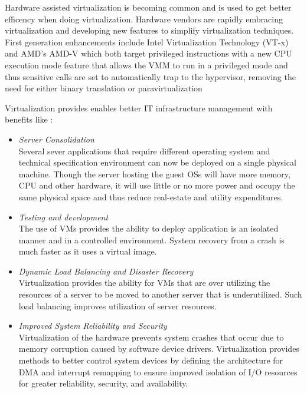 \documentclass[12pt,a4paper]{report}
\begin{document}
Hardware assisted virtualization is becoming common and is used to get better efficency when doing virtualization. Hardware vendors are rapidly embracing virtualization and developing new features
to simplify virtualization techniques. First generation enhancements include Intel
Virtualization Technology (VT-x) and AMD's AMD-V which both target privileged 
instructions with a new CPU execution mode feature that allows the VMM to run in a privileged mode and thus  sensitive calls are set to automatically trap to the hypervisor, removing the need for either binary translation or paravirtualization \cite{website:vmware}



Virtualization provides enables better IT infrastructure management with benefits like \cite{website:intel-VT}:

\begin{itemize}
  
\item \emph{Server Consolidation} \\
Several sever applications that require different operating system and technical specification 
environment can now be deployed on a single physical machine. Though the server hosting the guest 
OSs will have more memory, CPU and other hardware, it will use little or no more power and occupy 
the same physical space and thus reduce real-estate and utility expenditures.

\item \emph{Testing and development} \\
The use of VMs provides the ability to deploy application is an isolated manner and
in a controlled environment. System recovery from a crash is much faster as it uses a virtual
image.

\item \emph{Dynamic Load Balancing and Disaster Recovery} \\
Virtualization provides the ability for VMs that are over utilizing  the resources of a server to be moved to 
another server that is underutilized. Such load balancing improves utilization of server resources.

\item \emph{Improved System Reliability and Security} \\
Virtualization of the hardware prevents system crashes that occur due to memory corruption caused by 
software device drivers. Virtualization provides methods to better control system devices by defining the
architecture for DMA and interrupt remapping to ensure improved isolation of I/O resources for greater
reliability, security, and availability.
\end{itemize}
\end{document}
